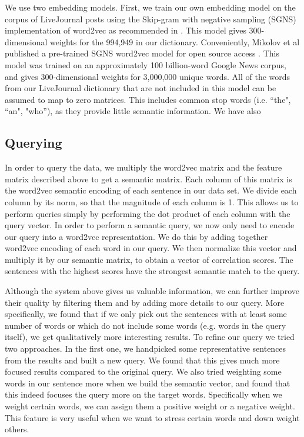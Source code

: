 \documentclass{sigchi}
\begin{document}
We use two embedding models. First, we train our own embedding model on the corpus of LiveJournal posts using the Skip-gram with negative sampling (SGNS) implementation of word2vec as recommended in \cite{MikolovSCCD13}. This model gives 300-dimensional weights for the 994,949 in our dictionary. Conveniently, Mikolov et al published a pre-trained SGNS word2vec model for open source access \cite{word2vecWEB}. This model was trained on an approximately 100 billion-word Google News corpus, and gives 300-dimensional weights for 3,000,000 unique words. All of the words from our LiveJournal dictionary that are not included in this model can be assumed to map to zero matrices. This includes common stop words (i.e. ``the", ``an", "who''), as they provide little semantic information.  We have also 

\subsection{Querying}
In order to query the data, we multiply the word2vec matrix and the feature matrix described above to get a semantic matrix. Each column of this matrix is the word2vec semantic encoding of each sentence in our data set. We divide each column by its norm, so that the magnitude of each column is 1. This allows us to perform queries simply by performing the dot product of each column with the query vector. In order to perform a semantic query, we now only need to encode our query into a word2vec representation. We do this by adding together word2vec encoding of each word in our query. We then normalize this vector and multiply it by our semantic matrix, to obtain a vector of correlation scores. The sentences with the highest scores have the strongest semantic match to the query.

Although the system above gives us valuable information, we can further improve their quality by filtering them and by adding more details to our query. More specifically, we found that if we only pick out the sentences with at least some number of words or which do not include some words (e.g. words in the query itself), we get qualitatively more interesting results. To refine our query we tried two approaches. In the first one, we handpicked some representative sentences from the results and built a new query. We found that this gives much more focused results compared to the original query. We also tried weighting some words in our sentence more when we build the semantic vector, and found that this indeed focuses the query more on the target words. Specifically when we weight certain words, we can assign them a positive weight or a negative weight. This feature is very useful when we want to stress certain words and down weight others. 
\end{document}
